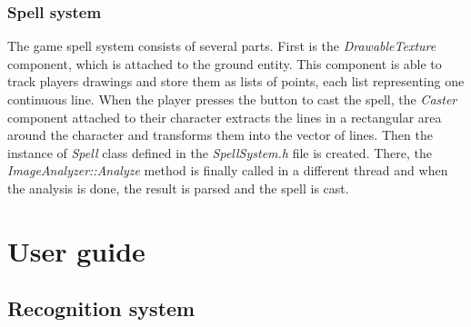 \subsection{Spell system}
The game spell system consists of several parts. First is the \emph{DrawableTexture} component, which is attached to the ground entity. This component is able to track players drawings and store them as lists of points, each list representing one continuous line. When the player presses the button to cast the spell, the \emph{Caster} component attached to their character extracts the lines in a rectangular area around the character and transforms them into the vector of lines. Then the instance of \emph{Spell} class defined in the \emph{SpellSystem.h} file is created. There, the \emph{ImageAnalyzer::Analyze} method is finally called in a different thread and when the analysis is done, the result is parsed and the spell is cast.

\chapter{User guide}
\section{Recognition system}
